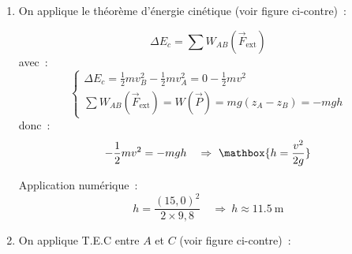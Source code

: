 \begin{enumerate}
    \item \mbox{}
          \begin{minipage}[t][][t]{0.65\linewidth}
              On applique le théorème d'énergie cinétique (voir figure
              ci-contre)~:
          
              \[
                  \Delta E_c=\sum W_{AB}(\vec{F}_{\text{ext}})
              \]
              avec~:
              \[
                  \left\{
                  \begin{array}{l}
                      \Delta E_c=\frac{1}{2}m v_B^2-\frac{1}{2}m v_A^2=
                      0-\frac{1}{2}m v^2 \\[3mm]
                      \sum W_{AB}(\vec{F}_{\text{ext}})=W(\vec{P})=
                      mg(z_{A}-z_{B})=-mgh
                  \end{array}\right.
              \]
              donc~:
              \[
                  -\frac{1}{2}m v^2=-mgh
                  \quad\Rightarrow\
                  \mathbox{h=\frac{v^{2}}{2g}}
              \]
          
              Application numérique~:
              \[
                  h=\frac{(15,0)^{2}}{2\times 9,8}
                  \quad\Rightarrow\
                  h\approx \qty{11.5}{\m}
              \]
          
          \end{minipage}
          \hfill
          \begin{minipage}[t][][t]{0.34\linewidth}
              \begin{figure}[H]
                  \centering
              \end{figure}
          \end{minipage}
    \item \mbox{}
          \begin{minipage}[t][][t]{0.52\linewidth}
              On applique T.E.C entre $A$ et $C$ (voir figure ci-contre)~:
          

\end{minipage}
\end{enumerate}
